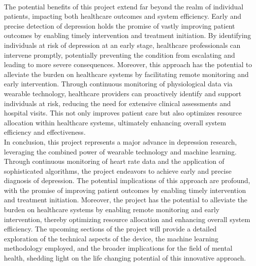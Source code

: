 \\
The potential benefits of this project extend far beyond the realm of individual patients, impacting both healthcare outcomes and system efficiency. Early and precise detection of depression holds the promise of vastly improving patient outcomes by enabling timely intervention and treatment initiation. By identifying individuals at risk of depression at an early stage, healthcare professionals can intervene promptly, potentially preventing the condition from escalating and leading to more severe consequences. Moreover, this approach has the potential to alleviate the burden on healthcare systems by facilitating remote monitoring and early intervention. Through continuous monitoring of physiological data via wearable technology, healthcare providers can proactively identify and support individuals at risk, reducing the need for extensive clinical assessments and hospital visits. This not only improves patient care but also optimizes resource allocation within healthcare systems, ultimately enhancing overall system efficiency and effectiveness.
\\
In conclusion, this project represents a major advance in depression research, leveraging the combined power of wearable technology and machine learning. Through continuous monitoring of heart rate data and the application of sophisticated algorithms, the project endeavors to achieve early and precise diagnosis of depression. The potential implications of this approach are profound, with the promise of improving patient outcomes by enabling timely intervention and treatment initiation. Moreover, the project has the potential to alleviate the burden on healthcare systems by enabling remote monitoring and early intervention, thereby optimizing resource allocation and enhancing overall system efficiency. The upcoming sections of the project will provide a detailed exploration of the technical aspects of the device, the machine learning methodology employed, and the broader implications for the field of mental health, shedding light on the life changing potential of this innovative approach.
\\
